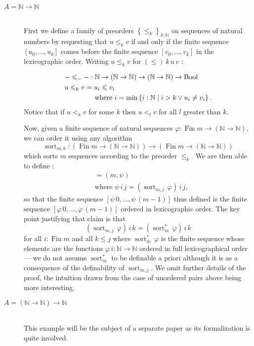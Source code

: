 \documentclass[envcountsame]{llncs}
\newcommand{\N}{\mathbb{N}}
\providecommand{\class}[1]{[#1]}
\providecommand{\set}  [1]{\left\{#1\right\}}
\DeclareMathOperator{\Bool}{Bool}
\DeclareMathOperator{\Fin}{Fin}
\DeclareMathOperator{\sort}{sort}
\begin{document}
\begin{description}
\item[$A=\N\to\N$] \hfill\\
First we define a family of preorders $\set{{\leq_k}}_{k:\N}$
on sequences of natural numbers by requesting that $u\leq_k v$
if and only if  the finite sequence $[u_0,\dots, u_k]$ comes before the finite sequence $[v_0,\dots, v_k]$ in the lexicographic order. Writing $u \leq_k v $ for $(\leq) \,k\,u\,v$ :


\begin{align*}
&{{-}\leq_{-}{-}} : \N\to (\N\to\N) \to (\N\to\N)\to \Bool\\
&{u\leq_k v} =  u_i\leq v_i \\
&\text{\phantom{$f\leq_n g =$} where }i =\min\set{i:\N\mid i>k\lor u_i\neq v_i}.
\end{align*}
Notice that if $u<_k v$ for some $k$ then $u<_l v$ for all $l$ greater than $k$.

Now, given a finite sequence of natural sequences $\varphi:\Fin m\to (\N\to\N)$, we can order it using any algorithm
\[\sort_{m,k} :(\Fin m \to (\N\to\N)) \to (\Fin m \to (\N\to\N))\]
which sorts $m$ sequences according to the preorder $\leq_k$.
We are then able to define :\begin{align*}
\class{(m,\varphi)} &= (m,\psi)\\
&\text{where $\psi\,i\,j = (\sort_{m,j}\,\varphi)\,i\,j$,}
\end{align*}
so that the finite sequence  $[\psi\,0,\dots,\psi\,(m-1)]$ thus defined is the finite sequence $[\varphi\,0,\dots,\varphi\,(m-1)]$ ordered in lexicographic order. The key point justifying that claim is that
\begin{equation}\label{eq:ms:order}
(\sort_{m, j}\,\varphi)\,i\,k=(\sort^\ast_{m}\,\varphi)\,i\,k
\end{equation}
for all $i:\Fin m$ and all $k\leq j$ where $\sort^\ast_m\,\varphi$ is the finite sequence whose elements are the functions $\varphi\,i:\N\to\N$ ordered in full lexicographical order --- we do not assume $\sort^\ast_m$ to be definable a priori although it is as a consequence of the definability of $\sort_{m,j}$.
We omit further details of the proof,  the intuition drawn from the case of unordered pairs above being more interesting.


\bigskip
\item[$A=(\N\to\N)\to\N$] \hfill\\
This example will be the subject of a separate paper as its formalization is quite involved.


\end{description}
\end{document}

